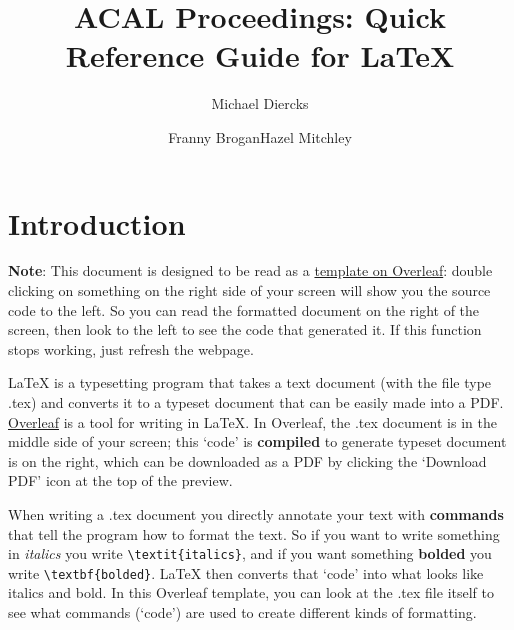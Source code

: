 \documentclass[output=paper,colorlinks,citecolor=brown,
]{langscibook}
\author{Michael Diercks\affiliation{Pomona College}\and Franny Brogan\affiliation{Pomona College}\lastand  Hazel Mitchley\affiliation{Rutgers University}}
\title{ACAL Proceedings: Quick Reference Guide for LaTeX}
\begin{document}
\maketitle

\begingroup
\let\cleardoublepage\clearpage
\tableofcontents
\endgroup

\section{Introduction}

\textbf{Note}: This document is designed to be read as a \href{https://www.overleaf.com/latex/templates/acal-proceedings-latex-quick-reference-guide/fncrcrtgnxhv}{template on Overleaf}: double clicking on something on the right side of your screen will show you the source code to the left. So you can read the formatted document on the right of the screen, then look to the left to see the code that generated it. If this function stops working, just refresh the webpage.

\LaTeX{} is a typesetting program that takes a text document (with the file type .tex) and converts it to a typeset document that can be easily made into a PDF. \href{https://www.overleaf.com}{Overleaf} is a tool for writing in \LaTeX{}. In Overleaf, the .tex document is in the middle side of your screen; this `code' is \textbf{compiled} to generate typeset document is on the right, which can be downloaded as a PDF by clicking the `Download PDF' icon  at the top of the preview.

When writing a .tex document you directly annotate your text with \textbf{commands} that tell the program how to format the text. So if you want to write something in \textit{italics} you write \verb|\textit{italics}|, and if you want something \textbf{bolded} you write \verb|\textbf{bolded}|. \LaTeX{} then converts that `code' into what looks like italics and bold. In this Overleaf template, you can look at the .tex file itself to see what commands (`code') are used to create different kinds of formatting. 

\end{document}
